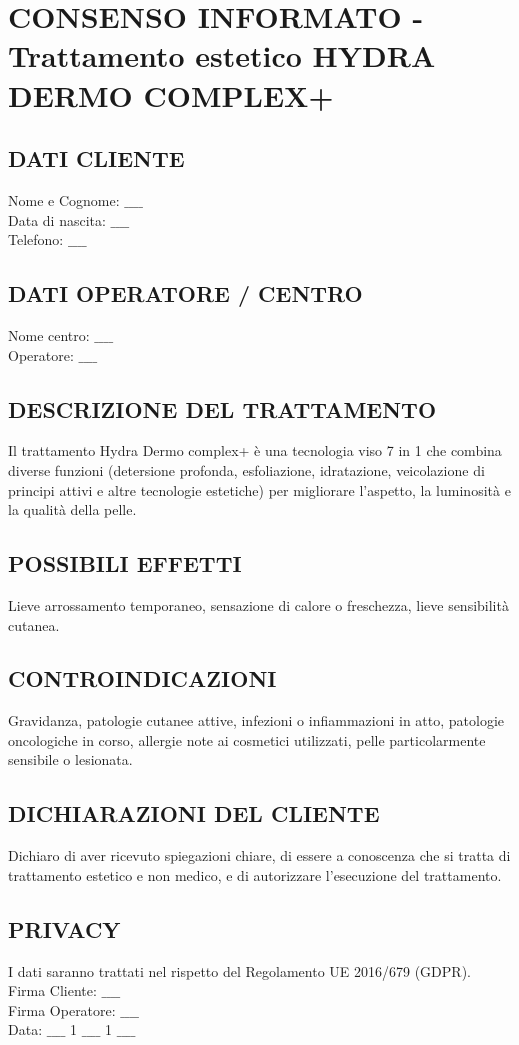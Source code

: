 \newpage

\section{CONSENSO INFORMATO - Trattamento estetico HYDRA DERMO COMPLEX+}
\subsection{DATI CLIENTE}
Nome e Cognome: $\_\_\_\_$\\
Data di nascita: $\_\_\_\_$\\
Telefono: $\_\_\_\_$

\subsection{DATI OPERATORE / CENTRO}
Nome centro: $\_\_\_\_$\\
Operatore: $\_\_\_\_$

\subsection{DESCRIZIONE DEL TRATTAMENTO}
Il trattamento Hydra Dermo complex+ è una tecnologia viso 7 in 1 che combina diverse funzioni (detersione profonda, esfoliazione, idratazione, veicolazione di principi attivi e altre tecnologie estetiche) per migliorare l'aspetto, la luminosità e la qualità della pelle.

\subsection{POSSIBILI EFFETTI}
Lieve arrossamento temporaneo, sensazione di calore o freschezza, lieve sensibilità cutanea.

\subsection{CONTROINDICAZIONI}
Gravidanza, patologie cutanee attive, infezioni o infiammazioni in atto, patologie oncologiche in corso, allergie note ai cosmetici utilizzati, pelle particolarmente sensibile o lesionata.

\subsection{DICHIARAZIONI DEL CLIENTE}
Dichiaro di aver ricevuto spiegazioni chiare, di essere a conoscenza che si tratta di trattamento estetico e non medico, e di autorizzare l'esecuzione del trattamento.

\subsection{PRIVACY}
I dati saranno trattati nel rispetto del Regolamento UE 2016/679 (GDPR).\\
Firma Cliente: $\_\_\_\_$\\
Firma Operatore: $\_\_\_\_$\\
Data: $\_\_\_\_$ 1 $\_\_\_\_$ 1 $\_\_\_\_$
